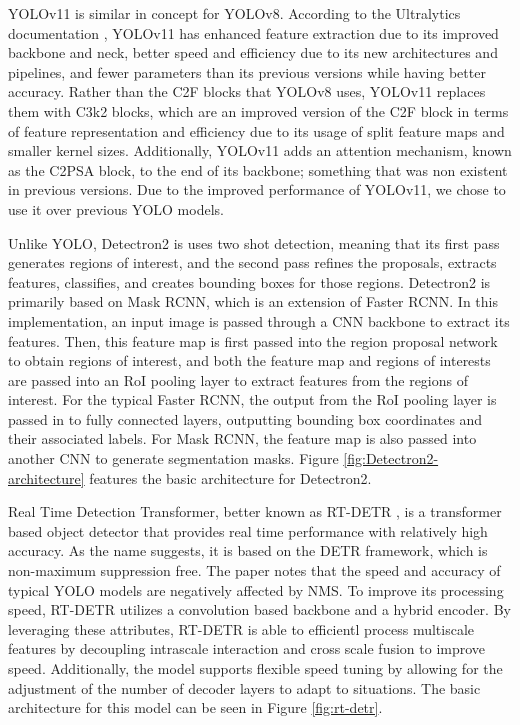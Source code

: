 \documentclass[stu,12pt,floatsintext]{apa7}
\begin{document}
YOLOv11 is similar in concept for YOLOv8. According to the Ultralytics documentation \parencite{yolo11_ultralytics}, YOLOv11 has enhanced feature extraction due to its improved backbone and neck, better speed and efficiency due to its new architectures and pipelines, and fewer parameters than its previous versions while having better accuracy. Rather than the C2F blocks that YOLOv8 uses, YOLOv11 replaces them with C3k2 blocks, which are an improved version of the C2F block in terms of feature representation and efficiency due to its usage of split feature maps and smaller kernel sizes. Additionally, YOLOv11 adds an attention mechanism, known as the C2PSA block, to the end of its backbone; something that was non existent in previous versions. Due to the improved performance of YOLOv11, we chose to use it over previous YOLO models.

Unlike YOLO, Detectron2 is uses two shot detection, meaning that its first pass generates regions of interest, and the second pass refines the proposals, extracts features, classifies, and creates bounding boxes for those regions. Detectron2 is primarily based on Mask RCNN, which is an extension of Faster RCNN. In this implementation, an input image is passed through a CNN backbone to extract its features. Then, this feature map is first passed into the region proposal network to obtain regions of interest, and both the feature map and regions of interests are passed into an RoI pooling layer to extract features from the regions of interest. For the typical Faster RCNN, the output from the RoI pooling layer is passed in to fully connected layers, outputting bounding box coordinates and their associated labels. For Mask RCNN, the feature map is also passed into another CNN to generate segmentation masks. Figure \ref{fig:Detectron2-architecture} features the basic architecture for Detectron2.

%
Real Time Detection Transformer, better known as RT-DETR \parencite{zhao_detrs_2024}, is a transformer based object detector that provides real time performance with relatively high accuracy. As the name suggests, it is based on the DETR framework, which is non-maximum suppression free. The paper notes that the speed and accuracy of typical YOLO models are negatively affected by NMS. To improve its processing speed, RT-DETR utilizes a convolution based backbone and a hybrid encoder. By leveraging these attributes, RT-DETR is able to efficientl process multiscale features by decoupling intrascale interaction and cross scale fusion to improve speed. Additionally, the model supports flexible speed tuning by allowing for the adjustment of the number of decoder layers to adapt to situations. The basic architecture for this model can be seen in Figure \ref{fig:rt-detr}.
\end{document}
